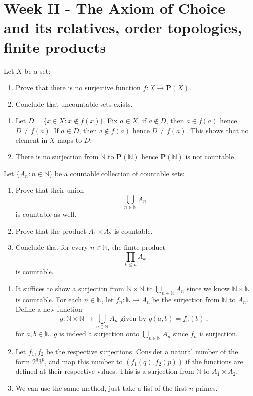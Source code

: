 \documentclass[../main.tex]{subfiles}
\begin{document}
\section{Week II - The Axiom of Choice and its relatives, order topologies, finite products}

\begin{problem}[1]
Let $X$ be a set:
\begin{enumerate}[label=(\alph*)]
	\item Prove that there is no surjective function $f : X \to \mathbf{P}(X)$.
	\item Conclude that uncountable sets exists.
\end{enumerate}
\end{problem}
\begin{enumerate}[label=(\alph*)]
	\item Let $D = \{ x \in X : x \notin f(x) \}$.
	      Fix $a \in X$, if $a \notin D$, then $a \in f(a)$ hence $D \ne f(a)$.
	      If $a \in D$, then $a \notin f(a)$ hence $D \ne f(a)$.
	      This shows that no element in $X$ maps to $D$.
	\item There is no surjection from $\mathbb{N}$ to $\mathbf{P}(\mathbb{N})$ hence $\mathbf{P}(\mathbb{N})$ is not countable.
\end{enumerate}

\begin{problem}[2]
Let $\{ A_n : n \in \mathbb{N} \}$ be a countable collection of countable sets:
\begin{enumerate}[label=(\alph*)]
	\item Prove that their union
	      \[ \bigcup_{n \in \mathbb{N}} A_n \]
	      is countable as well.
	\item Prove that the product $A_1 \times A_2$ is countable.
	\item Conclude that for every $n \in \mathbb{N}$, the finite product
	      \[ \prod_{k \le n} A_k \]
	      is countable.
\end{enumerate}
\end{problem}
\begin{enumerate}[label=(\alph*)]
	\item It suffices to show a surjection from $\mathbb{N} \times \mathbb{N}$ to $\bigcup_{n \in \mathbb{N}} A_n$ since we know $\mathbb{N} \times \mathbb{N}$ is countable.
	      For each $n \in \mathbb{N}$, let $f_n: \mathbb{N} \to A_n$ be the surjection from $\mathbb{N}$ to $A_n$.
	      Define a new function
	      \[
		      g : \mathbb{N} \times \mathbb{N} \to \bigcup_{n \in \mathbb{N}} A_n \text{ given by } g(a, b) = f_a(b) \; ,
	      \]
	      for $a, b \in \mathbb{N}$.
	      $g$ is indeed a surjection onto $\bigcup_{n \in \mathbb{N}} A_n$ since $f_n$ is surjection.
	\item Let $f_1, f_2$ be the respective surjections.
	      Consider a natural number of the form $2^q 3^p$, and map this number to $(f_1(q), f_2(p))$ if the functions are defined at their respective values.
	      This is a surjection from $\mathbb{N}$ to $A_1 \times A_2$.
	\item We can use the same method, just take a list of the first $n$ primes.
\end{enumerate}
\end{document}
